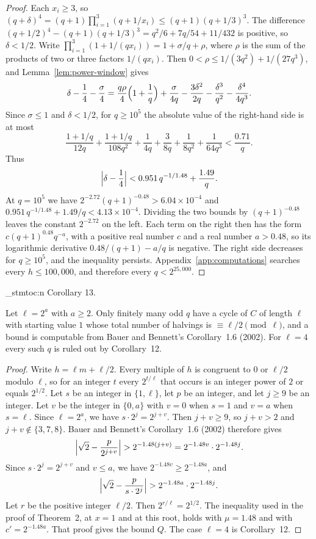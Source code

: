 \documentclass[11pt]{article}
\newenvironment{named}[1]{%
  \par\addvspace{\medskipamount}%
  \pagebreak[3]%
  \noindent{\bfseries #1}\space\ignorespaces
  \stmtoc{#1}%
}{\par\addvspace{\medskipamount}}
\newcommand{\stmtoc}[1]{ \qn_stmtoc:n {#1} }
\begin{document}
\begin{proof}
Each $x_i \ge 3$, so $(q+\delta)^4 = (q+1)\prod_{i=1}^{3}(q + 1/x_i) \le (q+1)(q+1/3)^3$.
The difference $(q+1/2)^4 - (q+1)(q+1/3)^3 = q^2/6 + 7q/54 + 11/432$ is positive, so $\delta < 1/2$.
Write $\prod_{i=1}^{3}(1 + 1/(q x_i)) = 1 + \sigma/q + \rho$, where $\rho$ is the sum of the products of two or three factors $1/(q x_i)$.
Then $0 < \rho \le 1/(3q^2) + 1/(27q^3)$, and Lemma~\ref{lem:power-window} gives
\[
\delta - \frac14 - \frac{\sigma}{4} = \frac{q\rho}{4}\Bigl(1+\frac1q\Bigr) + \frac{\sigma}{4q} - \frac{3\delta^2}{2q} - \frac{\delta^3}{q^2} - \frac{\delta^4}{4q^3}.
\]
Since $\sigma \le 1$ and $\delta < 1/2$, for $q \ge 10^5$ the absolute value of the right-hand side is at most
\[
\frac{1+1/q}{12q} + \frac{1+1/q}{108q^2} + \frac{1}{4q} + \frac{3}{8q} + \frac{1}{8q^2} + \frac{1}{64q^3} < \frac{0.71}{q}.
\]
Thus
\[
\Bigl|\delta - \frac14\Bigr| < 0.951\, q^{-1/1.48} + \frac{1.49}{q}.
\]
At $q = 10^5$ we have $2^{-2.72}(q+1)^{-0.48} > 6.04 \times 10^{-4}$ and $0.951\, q^{-1/1.48} + 1.49/q < 4.13 \times 10^{-4}$.
Dividing the two bounds by $(q+1)^{-0.48}$ leaves the constant $2^{-2.72}$ on the left.
Each term on the right then has the form $c(q+1)^{0.48} q^{-a}$, with a positive real number $c$ and a real number $a > 0.48$, so its logarithmic derivative $0.48/(q+1) - a/q$ is negative.
The right side decreases for $q \ge 10^5$, and the inequality persists.
Appendix~\ref{app:computations} searches every $h \le 100{,}000$, and therefore every $q < 2^{25{,}000}$.
\end{proof}

\begin{named}{Corollary 13.}
Let $\ell = 2^a$ with $a \ge 2$.
Only finitely many odd $q$ have a cycle of $C$ of length $\ell$ with starting value $1$ whose total number of halvings is $\equiv \ell/2 \pmod{\ell}$, and a bound is computable from Bauer and Bennett's Corollary~1.6 (2002).
For $\ell = 4$ every such $q$ is ruled out by Corollary~12.
\end{named}

\begin{proof}
Write $h = \ell m + \ell/2$.
Every multiple of $h$ is congruent to $0$ or $\ell/2$ modulo $\ell$, so for an integer $t$ every $2^{t/\ell}$ that occurs is an integer power of $2$ or equals $2^{1/2}$.
Let $s$ be an integer in $\{1, \ell\}$, let $p$ be an integer, and let $j \ge 9$ be an integer.
Let $v$ be the integer in $\{0, a\}$ with $v = 0$ when $s = 1$ and $v = a$ when $s = \ell$.
Since $\ell = 2^a$, we have $s \cdot 2^j = 2^{j+v}$.
Then $j+v \ge 9$, so $j+v > 2$ and $j+v \notin \{3, 7, 8\}$.
Bauer and Bennett's Corollary~1.6 (2002) therefore gives
\[
\Bigl|\sqrt{2} - \frac{p}{2^{j+v}}\Bigr| > 2^{-1.48(j+v)} = 2^{-1.48 v} \cdot 2^{-1.48 j}.
\]
Since $s \cdot 2^j = 2^{j+v}$ and $v \le a$, we have $2^{-1.48 v} \ge 2^{-1.48 a}$, and
\[
\Bigl|\sqrt{2} - \frac{p}{s \cdot 2^j}\Bigr| > 2^{-1.48 a} \cdot 2^{-1.48 j}.
\]
Let $r$ be the positive integer $\ell/2$. Then $2^{r/\ell} = 2^{1/2}$.
The inequality used in the proof of Theorem~2, at $x = 1$ and at this root, holds with $\mu = 1.48$ and with $c' = 2^{-1.48 a}$.
That proof gives the bound $Q$.
The case $\ell = 4$ is Corollary~12.
\end{proof}
\end{document}
